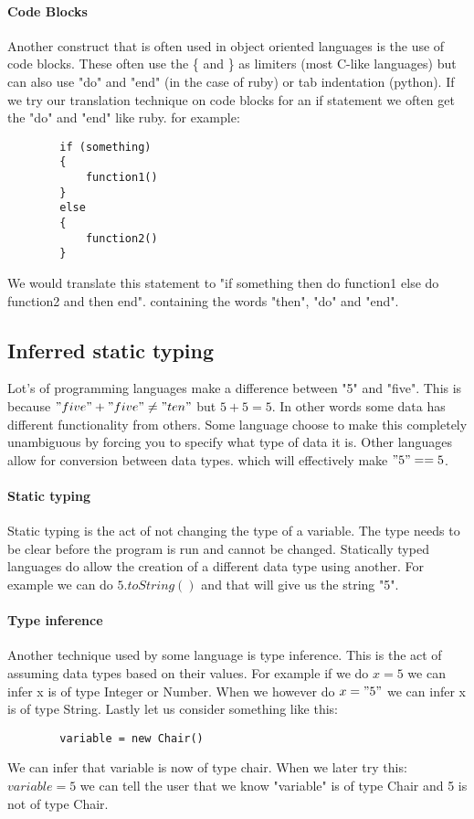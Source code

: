 \documentclass{scrartcl}
\begin{document}
    \paragraph{Code Blocks}
    Another construct that is often used in object oriented languages is the use
    of code blocks. These often use the \{ and \} as limiters (most C-like languages)
    but can also use "do" and "end" (in the case of ruby) or tab indentation (python).
    If we try our translation technique on code blocks for an if statement we often
    get the "do" and "end" like ruby. for example:
    \begin{lstlisting}
        if (something)
        {    
            function1()  
        }
        else
        {
            function2()
        }
    \end{lstlisting}
    We would translate this statement to "if something then do function1 else
    do function2 and then end". containing the words "then", "do" and "end". 

    \subsection{Inferred static typing}
    Lot's of programming languages make a difference between "5" and "five".
    This is because $"five" + "five" \neq "ten"$ but $5 + 5 = 5$. In other
    words some data has different functionality from others. Some language choose
    to make this completely unambiguous by forcing you to specify what type
    of data it is. Other languages allow for conversion between data types.
    which will effectively make $"5" == 5$. 

    \paragraph{Static typing}
    Static typing is the act of not changing the type of a variable. The type
    needs to be clear before the program is run and cannot be changed. Statically
    typed languages do allow the creation of a different data type using another.
    For example we can do $5.toString()$ and that will give us the string "5".

    \paragraph{Type inference}
    Another technique used by some language is type inference. This is the act
    of assuming data types based on their values. For example if we do $x = 5$
    we can infer x is of type Integer or Number. When we however do $x = "5"$
    we can infer x is of type String. Lastly let us consider something like this:
    \begin{lstlisting}
        variable = new Chair()
    \end{lstlisting}
    We can infer that variable is now of type chair. When we later try this:
    $variable = 5$ we can tell the user that we know "variable" is of type Chair
    and 5 is not of type Chair.
\end{document}
